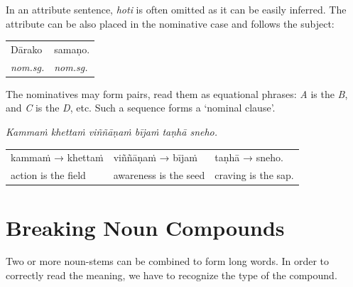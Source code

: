 \documentclass[11pt,oneside]{memoir}
\begin{document}
In an attribute sentence, \emph{hoti} is often omitted as it can be easily inferred.
The attribute can be also placed in the nominative case and follows the subject:

\begin{center}
\begin{tabular}{ll}
Dārako & samaṇo.\\
\emph{nom.sg.} & \emph{nom.sg.}\\
\end{tabular}
\end{center}

The nominatives may form pairs, read them as equational phrases: \emph{A} is the \emph{B},
and \emph{C} is the \emph{D}, etc. Such a sequence forms a `nominal clause'.

{\centering
\emph{Kammaṁ khettaṁ viññāṇaṁ bījaṁ taṇhā sneho.}
\par}

\begin{center}
\begin{tabular}{lll}
kammaṁ → khettaṁ & viññāṇaṁ → bījaṁ & taṇhā → sneho.\\
action is the field & awareness is the seed & craving is the sap.\\
\end{tabular}
\end{center}
\section{Breaking Noun Compounds}
\label{sec:org2956397}

Two or more noun-stems can be combined to form long words. In order to correctly
read the meaning, we have to recognize the type of the compound.
\end{document}

